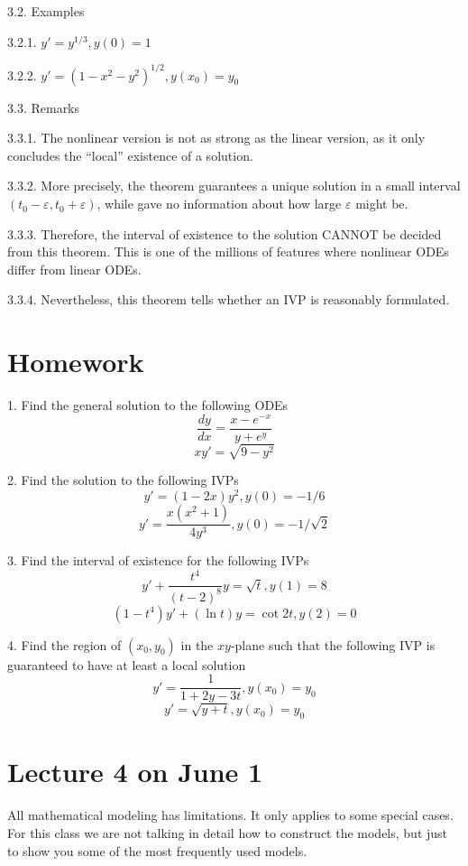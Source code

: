 \documentclass[11pt]{article}
\begin{document}
3.2. Examples 

3.2.1. $y' = y^{1/3}, y(0)=1$

3.2.2. $y' = (1-x^2 -y^2)^{1/2}, y(x_0)=y_0$

3.3. Remarks

3.3.1. The nonlinear version is not as strong as the linear version, as it only concludes the ``local'' existence of a solution.  

3.3.2.  More precisely, the theorem guarantees a unique solution in a small interval $\left(t_0-\varepsilon, t_0+\varepsilon\right)$, while gave no information about how large $\varepsilon$ might be.

3.3.3. Therefore, the interval of existence to the solution CANNOT be decided from this theorem. This is one of the millions of features where nonlinear ODEs differ from linear ODEs. 

3.3.4. Nevertheless, this theorem tells whether an IVP is reasonably formulated. 

\newpage

\section*{Homework}

1. Find the general solution to the following ODEs
$$\frac{dy}{dx}=\frac{x-e^{-x}}{y+e^y}$$
$$xy' = \sqrt{9-y^2}$$

2. Find the solution to the following IVPs
$$y' = (1-2x)y^2, y(0)=-1/6$$
$$y' = \frac{x(x^2+1)}{4y^3}, y(0)=-1/\sqrt{2}$$

3. Find the interval of existence for the following IVPs
$$y' + \frac{t^4}{(t-2)^8}y = \sqrt{t}, y(1)=8$$
$$(1-t^4) y' + (\ln t) y = \cot 2t, y(2)=0$$


4. Find the region of $(x_0, y_0)$ in the $xy$-plane such that the following IVP is guaranteed to have at least a local solution
$$y' = \frac 1 {1+2y-3t}, y(x_0)=y_0$$
$$y' =\sqrt{y+t}, y(x_0)=y_0$$

\newpage

\section{Lecture 4 on June 1}

All mathematical modeling has limitations. It only applies to some special cases. For this class we are not talking in detail how to construct the models, but just to show you some of the most frequently used models. \\
\end{document}
